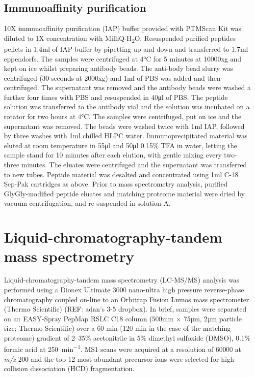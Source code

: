 \subsection{Immunoaffinity purification}
10X immunoaffinity purification (IAP) buffer provided with PTMScan Kit was diluted to 1X concentration with MilliQ-H\textsubscript{2}O. Resuspended purified peptides pellets in 1.4ml of IAP buffer by pipetting up and down and transferred to 1.7ml eppendorfs. The samples were centrifuged at 4\si{\degreeCelsius} for 5 minutes at 10000xg and kept on ice whilst preparing antibody beads.
The anti-body bead slurry was centrifuged (30 seconds at 2000xg) and 1ml of PBS was added and then centrifuged. The supernatant was removed and the antibody beads were washed a further four times with PBS and resuspended in 40\si{\ul} of PBS. The peptide solution was transferred to the antibody vial and the solution was incubated on a rotator for two hours at 4\si{\degreeCelsius}. The samples were centrifuged, put on ice and the supernatant was removed. The beads were washed twice with 1ml IAP, followed by three washes with 1ml chilled HLPC water. Immunoprecipitated material was eluted at room temperature in 55\si{\ul} and 50\si{\ul} 0.15\% TFA in water, letting the sample stand for 10 minutes after each elution, with gentle mixing every two-three minutes. The eluates were centrifuged and the supernatant was transferred to new tubes. Peptide material was desalted and concentrated using 1ml C-18 Sep-Pak cartridges as above. Prior to mass spectrometry analysis, purified GlyGly-modified peptide eluates and matching proteome material were dried by vacuum centrifugation, and re-suspended in solution A.
%

\section{Liquid-chromatography-tandem mass spectrometry}
Liquid-chromatography-tandem mass spectrometry (LC-MS/MS) analysis was performed using a Dionex Ultimate 3000 nano-ultra high pressure reverse-phase chromatography coupled on-line to an Orbitrap Fusion Lumos mass spectrometer (Thermo Scientific) (REF: adan's 3-5 dropbox). In brief, samples were separated on an EASY-Spray PepMap RSLC C18 column (500\si{\mm} × 75\si{\um}, 2\si{\um} particle size; Thermo Scientific) over a 60 min (120 min in the case of the matching proteome) gradient of 2–35\% acetonitrile in 5\% dimethyl sulfoxide (DMSO), 0.1\% formic acid at 250\si{\nl\per\minute}. MS1 scans were acquired at a resolution of 60000 at \textit{m/z} 200 and the top 12 most abundant precursor ions were selected for high collision dissociation (HCD) fragmentation.

